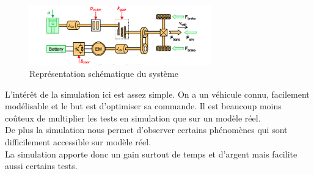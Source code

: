\begin{figure}[ht]
	\begin{center}
	\includegraphics[width=0.7\textwidth]{images/Systeme_VEH.png}
	\caption{Représentation schématique du système}\label{img:Schéma système VEH}
	\end{center}
\end{figure}
\FloatBarrier 

		
L'intérêt de la simulation ici est assez simple. On a un véhicule connu, facilement modélisable et le but est d'optimiser sa commande. Il est beaucoup moins coûteux de multiplier les tests en simulation que sur un modèle réel.\\
De plus la simulation nous permet d'observer certains phénomènes qui sont difficilement accessible sur modèle réel.\\
La simulation apporte donc un gain surtout de temps et d'argent mais facilite aussi certains tests.\\
